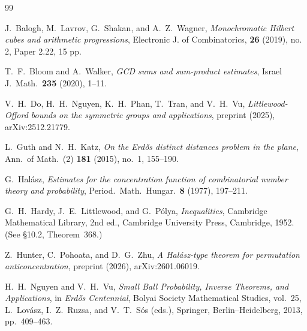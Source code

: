 \documentclass[12pt]{amsart}
\theoremstyle{definition}
\theoremstyle{remark}
\begin{document}
\begin{thebibliography}{99}

J.~Balogh, M.~Lavrov, G.~Shakan, and A.~Z.~Wagner,
\newblock \emph{Monochromatic Hilbert cubes and arithmetic progressions},
\newblock Electronic J. of Combinatorics, \textbf{26} (2019), no. 2, Paper 2.22, 15 pp. 

T.~F.~Bloom and A.~Walker,
\newblock \emph{GCD sums and sum-product estimates},
\newblock Israel J.\ Math.\ \textbf{235} (2020), 1--11.

V.~H.~Do, H.~H.~Nguyen, K.~H.~Phan, T.~Tran, and V.~H.~Vu,
\newblock \emph{Littlewood-Offord bounds on the symmetric groups and applications},
\newblock preprint (2025), arXiv:2512.21779.



L.~Guth and N.~H.~Katz,
\newblock \emph{On the {E}rd\H{o}s distinct distances problem in the plane},
\newblock Ann.\ of Math.\ (2) \textbf{181} (2015), no.~1, 155--190.

G.~Hal\'asz,
\newblock \emph{Estimates for the concentration function of combinatorial number theory and probability},
\newblock Period.\ Math.\ Hungar.\ \textbf{8} (1977), 197--211.

G.~H.~Hardy, J.~E.~Littlewood, and G.~P\'olya,
\newblock \emph{Inequalities},
\newblock Cambridge Mathematical Library, 2nd ed.,
Cambridge University Press, Cambridge, 1952.
\newblock (See \S10.2, Theorem~368.)

Z.~Hunter, C.~Pohoata, and D.~G.~Zhu,
\newblock \emph{A Hal\'asz-type theorem for permutation anticoncentration},
\newblock preprint (2026), arXiv:2601.06019.


H.~H.~Nguyen and V.~H.~Vu,
\newblock \emph{Small Ball Probability, Inverse Theorems, and Applications},
\newblock in \emph{Erd\H{o}s Centennial}, Bolyai Society Mathematical Studies, vol.~25,
L.~Lov\'asz, I.~Z.~Ruzsa, and V.~T.~S\'os (eds.),
Springer, Berlin--Heidelberg, 2013, pp.~409--463.


\end{thebibliography}
\end{document}
